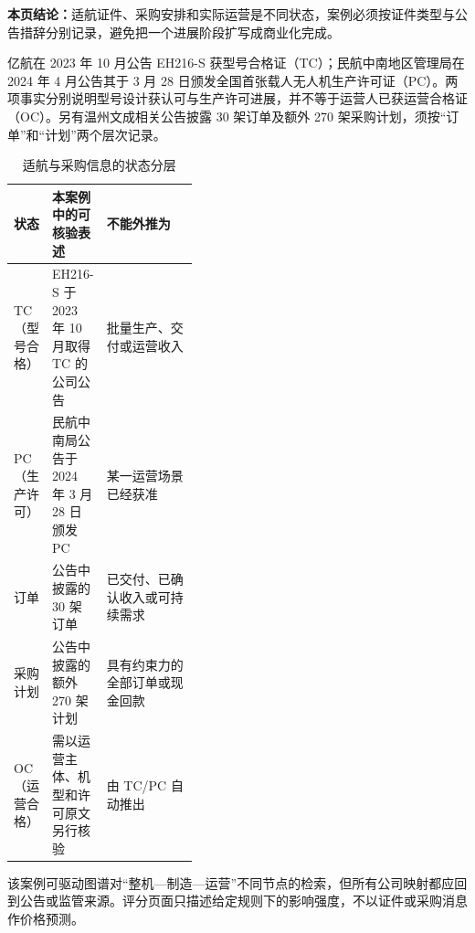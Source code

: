 \textbf{本页结论：}适航证件、采购安排和实际运营是不同状态，案例必须按证件类型与公告措辞分别记录，避免把一个进展阶段扩写成商业化完成。

亿航在 2023 年 10 月公告 EH216-S 获型号合格证（TC）\cite{wty-ehang-tc}；民航中南地区管理局在 2024 年 4 月公告其于 3 月 28 日颁发全国首张载人无人机生产许可证（PC）\cite{wty-caac-pc}。两项事实分别说明型号设计获认可与生产许可进展，并不等于运营人已获运营合格证（OC）。另有温州文成相关公告披露 30 架订单及额外 270 架采购计划，须按“订单”和“计划”两个层次记录\cite{wty-ehang-wencheng}。

\begin{table}[htbp]
\centering
\caption{适航与采购信息的状态分层}
\label{tab:wty-airworthiness-case}
\small
\begin{tabularx}{\linewidth}{p{0.16\linewidth}p{0.24\linewidth}X}
\toprule
状态 & 本案例中的可核验表述 & 不能外推为 \\
\midrule
TC（型号合格） & EH216-S 于 2023 年 10 月取得 TC 的公司公告 & 批量生产、交付或运营收入 \\
PC（生产许可） & 民航中南局公告于 2024 年 3 月 28 日颁发 PC & 某一运营场景已经获准 \\
订单 & 公告中披露的 30 架订单 & 已交付、已确认收入或可持续需求 \\
采购计划 & 公告中披露的额外 270 架计划 & 具有约束力的全部订单或现金回款 \\
OC（运营合格） & 需以运营主体、机型和许可原文另行核验 & 由 TC/PC 自动推出 \\
\bottomrule
\end{tabularx}
\end{table}

该案例可驱动图谱对“整机—制造—运营”不同节点的检索，但所有公司映射都应回到公告或监管来源。评分页面只描述给定规则下的影响强度，不以证件或采购消息作价格预测。
